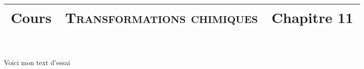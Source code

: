 \documentclass[a4paper,11pt,fleqn]{article}%
\title{\vspace{-1cm}\large 
	\begin{tabular}{|>{\centering}m{5cm}|>{\centering}m{8cm}|>{\centering\arraybackslash}m{4cm}|}
		\hline
		Cours & \textbf{\textsc{Transformations chimiques}} &  Chapitre 11 \\
		\hline
\end{tabular}
\vspace{-5em}}
\date{}
\begin{document}
\maketitle
Voici mon text d'essai
\end{document}
